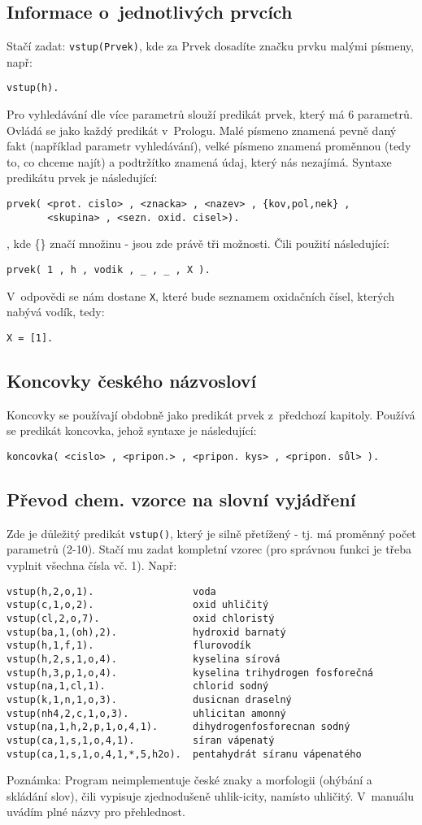 \documentclass[a4paper]{article}
\begin{document}
\subsection{Informace o~jednotlivých prvcích}
Stačí zadat: \texttt{vstup(Prvek)}, kde za Prvek dosadíte značku prvku malými písmeny, např:
\begin{verbatim}
vstup(h).
\end{verbatim}
Pro vyhledávání dle více parametrů slouží predikát prvek, který má 6 parametrů. Ovládá se jako každý predikát v~Prologu. Malé písmeno znamená pevně daný fakt (například parametr vyhledávání), velké písmeno znamená proměnnou (tedy to, co chceme najít) a podtržítko znamená údaj, který nás nezajímá. Syntaxe predikátu prvek je následující:
\begin{verbatim}
prvek( <prot. cislo> , <znacka> , <nazev> , {kov,pol,nek} , 
	   <skupina> , <sezn. oxid. cisel>). 
\end{verbatim}
, kde \{\} značí množinu - jsou zde právě tři možnosti. Čili použití následující:
\begin{verbatim}
prvek( 1 , h , vodik , _ , _ , X ).
\end{verbatim}
V~odpovědi se nám dostane \texttt{X}, které bude seznamem oxidačních čísel, kterých nabývá vodík, tedy:
\begin{verbatim}
X = [1].
\end{verbatim}

\subsection{Koncovky českého názvosloví}
Koncovky se používají obdobně jako predikát prvek z~předchozí kapitoly. Používá se predikát koncovka, jehož syntaxe je následující:
\begin{verbatim}
koncovka( <cislo> , <pripon.> , <pripon. kys> , <pripon. sůl> ).
\end{verbatim}
\subsection{Převod chem. vzorce na slovní vyjádření}
Zde je důležitý predikát \texttt{vstup()}, který je silně přetížený - tj. má proměnný počet parametrů (2-10). Stačí mu zadat kompletní vzorec (pro správnou funkci je třeba vyplnit všechna čísla vč. 1). Např:
\begin{verbatim}
vstup(h,2,o,1).                 voda
vstup(c,1,o,2).                 oxid uhličitý
vstup(cl,2,o,7).                oxid chloristý
vstup(ba,1,(oh),2).             hydroxid barnatý
vstup(h,1,f,1).                 flurovodík
vstup(h,2,s,1,o,4).             kyselina sírová
vstup(h,3,p,1,o,4).             kyselina trihydrogen fosforečná
vstup(na,1,cl,1).               chlorid sodný
vstup(k,1,n,1,o,3).             dusicnan draselný
vstup(nh4,2,c,1,o,3).           uhlicitan amonný
vstup(na,1,h,2,p,1,o,4,1).      dihydrogenfosforecnan sodný
vstup(ca,1,s,1,o,4,1).          síran vápenatý
vstup(ca,1,s,1,o,4,1,*,5,h2o).  pentahydrát síranu vápenatého
\end{verbatim}
Poznámka: Program neimplementuje české znaky a morfologii (ohýbání a skládání slov), čili vypisuje zjednodušeně uhlik-icity, namísto uhličitý. V~manuálu uvádím plné názvy pro přehlednost.
\end{document}
